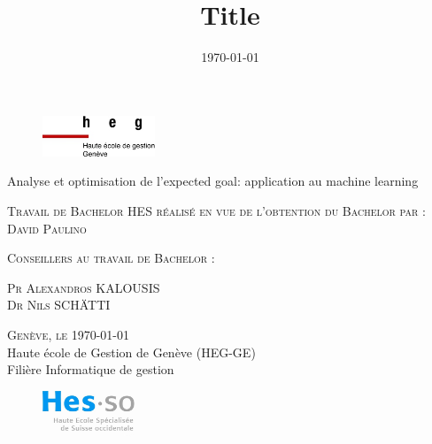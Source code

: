 \documentclass[12pt]{article}
\title{Title}
\author{\DP}
\date{\today}
\newcommand{\DP}{David Paulino}
\newcommand{\place}{Genève}
\newcommand{\fulltitle}{Analyse et optimisation de l'expected goal: application au machine learning}
\begin{document}
\begin{titlepage}

    \begin{figure}[h]
        \includegraphics[width=0.3\textwidth]{img/logo_heg-ge.jpg}
    \end{figure}

    \vspace*{0.5cm}

    \begin{center}

        \begingroup \linespread{1,75} \selectfont
        {\Large \fulltitle}\\[0,75cm]
        \endgroup



        \vspace{1.5cm}

        \textsc{\large Travail de Bachelor HES réalisé en vue de \newline l’obtention du Bachelor par :}\\[0,50cm]

        \begingroup \linespread{1,5} \selectfont
        \textsc{\large \DP}\\[0,50cm]
        \endgroup


        \vspace{1cm}


        \textsc{\large Conseillers au travail de Bachelor : }

        \begingroup \linespread{1,5} \selectfont
        \textsc{\large Pr Alexandros KALOUSIS}\\[0.1cm]
        \textsc{\large Dr Nils SCHÄTTI}\\[1cm]
        \endgroup


        \begingroup \linespread{1,75} \selectfont
        \textsc{\large \place, le \today}\\[0,1cm]

        {\large Haute école de Gestion de Genève (HEG-GE)}\\[0,1cm]

        {\large Filière Informatique de gestion}\\[0,1cm]
        \endgroup



        \begin{figure}[h]
            \vspace{0.05cm}
            \hspace*{12cm}\includegraphics[width=0.25\textwidth]{img/logo_hes-so.jpg}
        \end{figure}

    \end{center}



    \vfill
\end{titlepage}
\end{document}
